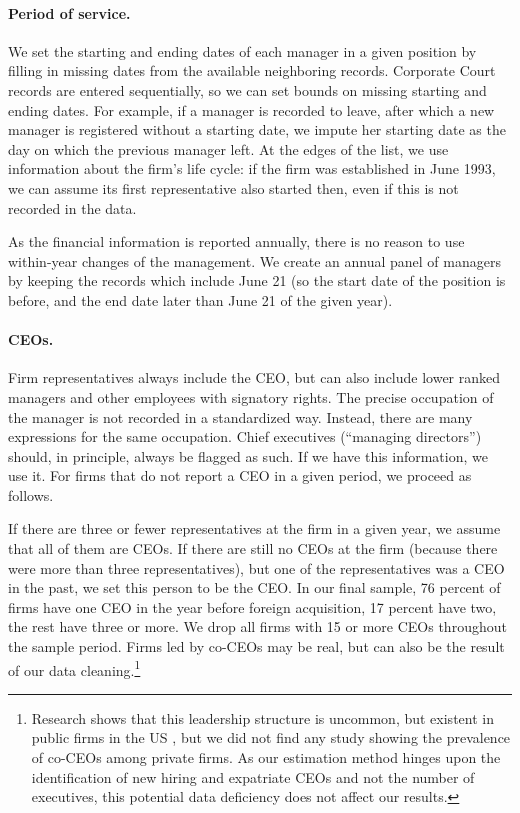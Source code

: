 \documentclass[12pt,a4paper]{article}
\begin{document}
\paragraph{Period of service.} We set the starting and ending dates of each manager in a given position by filling in missing dates from the available neighboring records. Corporate Court records are entered sequentially, so we can set bounds on missing starting and ending dates. For example, if a manager is recorded to leave, after which a new manager is registered without a starting date, we impute her starting date as the day on which the previous manager left. At the edges of the list, we use information about the firm's life cycle: if the firm was established in June 1993, we can assume its first representative also started then, even if this is not recorded in the data.

As the financial information is reported annually, there is no reason to use within-year changes of the management. We create an annual panel of managers by keeping the records which include June 21 (so the start date of the position is before, and the end date later than June 21 of the given year). 

\paragraph{CEOs.} Firm representatives always include the CEO, but can also include lower ranked managers and other employees with signatory rights. The precise occupation of the manager is not recorded in a standardized way. Instead, there are many expressions for the same occupation. Chief executives (``managing directors'') should, in principle, always be flagged as such. If we have this information, we use it. For firms that do not report a CEO in a given period, we proceed as follows. 

If there are three or fewer representatives at the firm in a given year, we assume that all of them are CEOs. If there are still no CEOs at the firm (because there were more than three representatives), but one of the representatives was a CEO in the past, we set this person to be the CEO. In our final sample, 76 percent of firms have one CEO in the year before foreign acquisition, 17 percent have two, the rest have three or more. We drop all firms with 15 or more CEOs throughout the sample period. Firms led by co-CEOs may be real, but can also be the result of our data cleaning.\footnote{Research shows that this leadership structure is uncommon, but existent in public firms in the US \citep{krause2015s}, but we did not find any study showing the prevalence of co-CEOs among private firms. As our estimation method hinges upon the identification of new hiring and expatriate CEOs and not the number of executives, this potential data deficiency does not affect our results.}  
\end{document}
